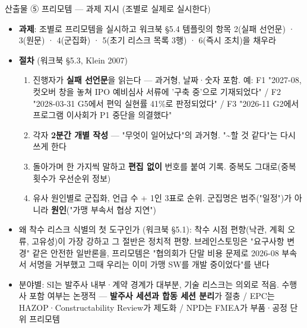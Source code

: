 \begin{frame}[allowframebreaks=1.0]{산출물 ⑤ 프리모템 — 과제 지시 (조별로 실제로 실시한다)}
\small
\begin{itemize}
\item\relax \textbf{과제}: 조별로 프리모템을 실시하고 워크북 §5.4 템플릿의 항목 2(실패 선언문) · 3(원문) · 4(군집화) · 5(초기 리스크 목록 3행) · 6(즉시 조치)을 채우라
\item\relax \textbf{절차} (워크북 §5.3, Klein 2007)
\par\nobreak
\begin{enumerate}
\item\relax 진행자가 \textbf{실패 선언문}을 읽는다 — 과거형, 날짜·숫자 포함. 예: F1 "2027-08, 컷오버 창을 놓쳐 IPO 예비심사 서류에 '구축 중'으로 기재되었다" / F2 "2028-03-31 G5에서 편익 실현률 41\%로 판정되었다" / F3 "2026-11 G2에서 프로그램 이사회가 P1 중단을 의결했다"
\item\relax 각자 \textbf{2분간 개별 작성} — "무엇이 일어났다"의 과거형. "\textasciitilde{}할 것 같다"는 다시 쓰게 한다
\item\relax 돌아가며 한 가지씩 말하고 \textbf{편집 없이} 번호를 붙여 기록. 중복도 그대로(중복 횟수가 우선순위 정보)
\item\relax 유사 원인별로 군집화, 언급 수 + 1인 3표로 순위. 군집명은 범주("일정")가 아니라 \textbf{원인}("가맹 부속서 협상 지연")
\end{enumerate}
\item\relax 왜 착수 리스크 식별의 첫 도구인가 (워크북 §5.1): 착수 시점 편향(낙관, 계획 오류, 고유성)이 가장 강하고 그 절반은 정치적 편향. 브레인스토밍은 "요구사항 변경" 같은 안전한 일반론을, 프리모템은 "협의회가 단말 비용 문제로 2026-08 부속서 서명을 거부했고 그때 우리는 이미 가맹 SW를 개발 중이었다"를 낸다
\item\relax 분야별: SI는 발주사 내부·계약 경계가 대부분, 기술 리스크는 의외로 적음. 수행사 포함 여부는 논쟁적 — \textbf{발주사 세션과 합동 세션 분리}가 절충 / EPC는 HAZOP·Constructability Review가 제도화 / NPD는 FMEA가 부품·공정 단위 프리모템
\end{itemize}
\end{frame}

